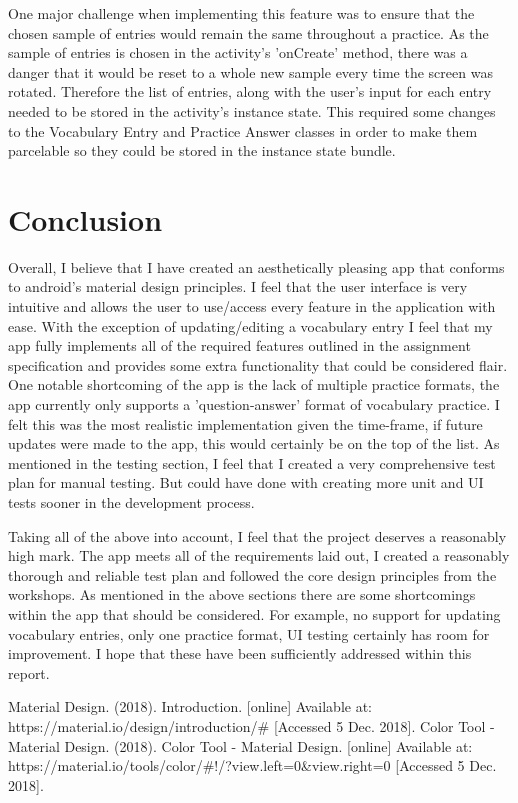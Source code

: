 \documentclass[runningheads]{llncs}
\begin{document}
	One major challenge when implementing this feature was to ensure that the chosen sample of entries would remain the same throughout a practice. As the sample of entries is chosen in the activity's 'onCreate' method, there was a danger that it would be reset to a whole new sample every time the screen was rotated. Therefore the list of entries, along with the user's input for each entry needed to be stored in the activity's instance state. This required some changes to the Vocabulary Entry and Practice Answer classes in order to make them parcelable so they could be stored in the instance state bundle.
	
	\section{Conclusion}
	Overall, I believe that I have created an aesthetically pleasing app that conforms to android's material design principles. I feel that the user interface is very intuitive and allows the user to use/access every feature in the application with ease. With the exception of updating/editing a vocabulary entry I feel that my app fully implements all of the required features outlined in the assignment specification and provides some extra functionality that could be considered flair. One notable shortcoming of the app is the lack of multiple practice formats, the app currently only supports a 'question-answer' format of vocabulary practice. I felt this was the most realistic implementation given the time-frame, if future updates were made to the app, this would certainly be on the top of the list. As mentioned in the testing section, I feel that I created a very comprehensive test plan for manual testing. But could have done with creating more unit and UI tests sooner in the development process.
	
	Taking all of the above into account, I feel that the project deserves a reasonably high mark. The app meets all of the requirements laid out, I created a reasonably thorough and reliable test plan and followed the core design principles from the workshops. As mentioned in the above sections there are some shortcomings within the app that should be considered. For example, no support for updating vocabulary entries, only one practice format, UI testing certainly has room for improvement. I hope that these have been sufficiently addressed within this report.
	 
	\begin{thebibliography}{10}
		Material Design. (2018). Introduction. [online] Available at: https://material.io/design/introduction/\# [Accessed 5 Dec. 2018].
		Color Tool - Material Design. (2018). Color Tool - Material Design. [online] Available at: https://material.io/tools/color/\#!/?view.left=0\&view.right=0 [Accessed 5 Dec. 2018].
		
	\end{thebibliography}
	
\end{document}
